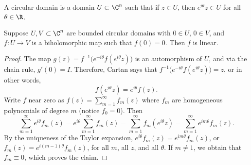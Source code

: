A circular domain is a domain $U\subset\C^n$ such that if $z\in U$, then $e^{i\theta}z\in U$ for all $\theta\in\R$.
\begin{cor}
Suppose $U,V\subset\C^n$ are bounded circular domains with $0\in U$, $0\in V$, and $f:U\to V$ is a biholomorphic map such that $f(0)=0$. Then $f$ is linear.
\end{cor}
\begin{proof}
The map $g(z)=f^{-1}\bigl(e^{-i\theta}f(e^{i\theta}z)\bigr)$ is an automorphism of $U$, and via the chain rule, $g'(0)=I$. Therefore, Cartan says that $f^{-1}\bigl(e^{-i\theta}f(e^{i\theta}z)\bigr)=z$, or in other words,
\[f(e^{i\theta}z)=e^{i\theta}f(z).\]
Write $f$ near zero as $f(z)=\sum_{m=1}^\infty f_m(z)$ where $f_m$ are homogeneous polynomials of degree $m$ (notice $f_0=0$). Then
\[
\sum_{m=1}^\infty e^{i\theta}f_m(z)=e^{i\theta}\sum_{m=1}^\infty f_m(z)=\sum_{m=1}^\infty f_m(e^{i\theta}z)=\sum_{m=1}^\infty e^{im\theta}f_m(z).
\]
By the uniqueness of the Taylor expansion, $e^{i\theta}f_m(z)=e^{im\theta}f_m(z)$, or $f_m(z)=e^{i(m-1)\theta}f_m(z)$, for all $m$, all $z$, and all $\theta$. If $m\neq1$, we obtain that $f_m\equiv0$, which proves the claim.
\end{proof}
